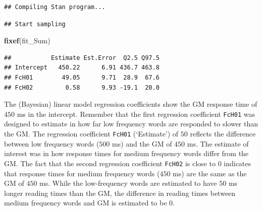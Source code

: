 \documentclass[12pt,]{krantz}
\newenvironment{Shaded}{\begin{snugshade}}{\end{snugshade}}
\newcommand{\DataTypeTok}[1]{\textcolor[rgb]{0.13,0.29,0.53}{#1}}
\newcommand{\DecValTok}[1]{\textcolor[rgb]{0.00,0.00,0.81}{#1}}
\newcommand{\KeywordTok}[1]{\textcolor[rgb]{0.13,0.29,0.53}{\textbf{#1}}}
\newcommand{\NormalTok}[1]{#1}
\newcommand{\OperatorTok}[1]{\textcolor[rgb]{0.81,0.36,0.00}{\textbf{#1}}}
\newcommand{\StringTok}[1]{\textcolor[rgb]{0.31,0.60,0.02}{#1}}
\theoremstyle{definition}
\theoremstyle{definition}
\theoremstyle{definition}
\theoremstyle{remark}
\begin{document}
\begin{Shaded}
\end{Shaded}

\begin{verbatim}
## Compiling Stan program...
\end{verbatim}

\begin{verbatim}
## Start sampling
\end{verbatim}

\begin{Shaded}
\begin{Highlighting}[]
\KeywordTok{fixef}\NormalTok{(fit_Sum)}
\end{Highlighting}
\end{Shaded}

\begin{verbatim}
##           Estimate Est.Error  Q2.5 Q97.5
## Intercept   450.22      6.91 436.7 463.8
## FcH01        49.05      9.71  28.9  67.6
## FcH02         0.58      9.93 -19.1  20.0
\end{verbatim}

The (Bayesian) linear model regression coefficients show the GM response time of \(450\) ms in the intercept. Remember that the first regression coefficient \texttt{FcH01} was designed to estimate in how far low frequency words are responded to slower than the GM. The regression coefficient \texttt{FcH01} (`Estimate') of \(50\) reflects the difference between low frequency words (\(500\) ms) and the GM of \(450\) ms. The estimate of interest was in how response times for medium frequency words differ from the GM. The fact that the second regression coefficient \texttt{FcH02} is close to \(0\) indicates that response times for medium frequency words (\(450\) ms) are the same as the GM of \(450\) ms. While the low-frequency words are estimated to have \(50\) ms longer reading times than the GM, the difference in reading times between medium frequency words and GM is estimated to be \(0\).
\end{document}

